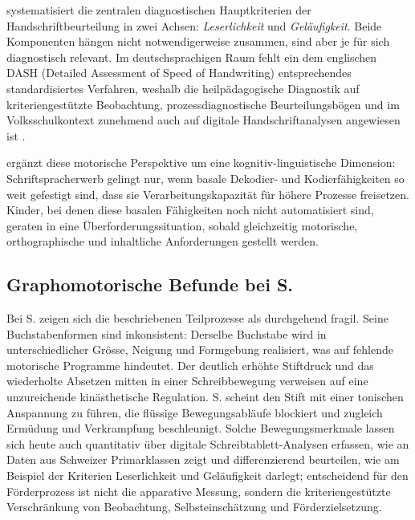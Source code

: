 \documentclass[ngerman, a4paper]{article}
\begin{document}
\textcite[S.\,3,\,11]{hurschler2020handschriftbeurteilung} systematisiert die zentralen
diagnostischen Hauptkriterien der Handschriftbeurteilung in zwei Achsen:
\textit{Leserlichkeit} und \textit{Geläufigkeit}. Beide Komponenten hängen
nicht notwendigerweise zusammen, sind aber je für sich diagnostisch relevant.
Im deutschsprachigen Raum fehlt ein dem englischen DASH (Detailed Assessment
of Speed of Handwriting) entsprechendes standardisiertes Verfahren, weshalb
die heilpädagogische Diagnostik auf kriteriengestützte Beobachtung,
prozessdiagnostische Beurteilungsbögen und im Volksschulkontext zunehmend
auch auf digitale Handschriftanalysen angewiesen ist
\parencite[S.\,11]{hurschler2020handschriftbeurteilung}.

\textcite[Kap.\,1--4]{gold2018lesenkannmanlernen} ergänzt diese motorische Perspektive um eine kognitiv-linguistische Dimension:
Schriftspracherwerb gelingt nur, wenn basale Dekodier- und Kodierfähigkeiten so weit
gefestigt sind, dass sie Verarbeitungskapazität für höhere Prozesse freisetzen. Kinder,
bei denen diese basalen Fähigkeiten noch nicht automatisiert sind, geraten in eine
Überforderungssituation, sobald gleichzeitig motorische, orthographische und inhaltliche
Anforderungen gestellt werden.

\subsection{Graphomotorische Befunde bei S.}

Bei S. zeigen sich die beschriebenen Teilprozesse als durchgehend fragil. Seine
Buchstabenformen sind inkonsistent: Derselbe Buchstabe wird in unterschiedlicher Grösse,
Neigung und Formgebung realisiert, was auf fehlende motorische Programme hindeutet. Der
deutlich erhöhte Stiftdruck und das wiederholte Absetzen mitten in einer Schreibbewegung
verweisen auf eine unzureichende kinästhetische Regulation. S. scheint den Stift mit einer
tonischen Anspannung zu führen, die flüssige Bewegungsabläufe blockiert und zugleich
Ermüdung und Verkrampfung beschleunigt. Solche Bewegungsmerkmale lassen sich heute auch quantitativ über digitale
Schreibtablett-Analysen erfassen, wie
\textcite{hurschlerlichtsteiner2024handschriftanalysen} an Daten aus
Schweizer Primarklassen zeigt und differenzierend beurteilen, wie
\textcite[S.\,3,\,11]{hurschler2020handschriftbeurteilung} am Beispiel der
Kriterien Leserlichkeit und Geläufigkeit darlegt; entscheidend für den
Förderprozess ist nicht die apparative Messung, sondern die
kriteriengestützte Verschränkung von Beobachtung, Selbsteinschätzung und
Förderzielsetzung.
\end{document}
